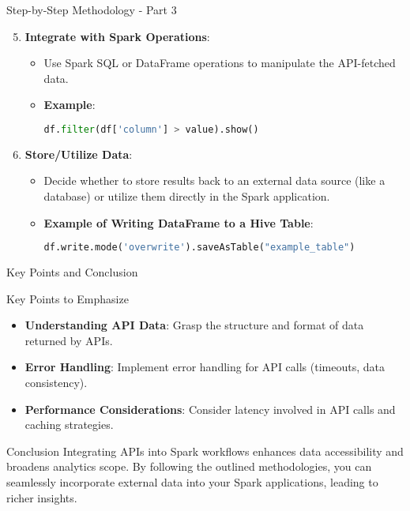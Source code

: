 \documentclass[aspectratio=169]{beamer}
\begin{document}
\begin{frame}{Step-by-Step Methodology - Part 3}
    \begin{enumerate}
        \setcounter{enumi}{4}
        \item \textbf{Integrate with Spark Operations}:
        \begin{itemize}
            \item Use Spark SQL or DataFrame operations to manipulate the API-fetched data.
            \item \textbf{Example}:
            \begin{lstlisting}[language=Python]
df.filter(df['column'] > value).show()
            \end{lstlisting}
        \end{itemize}

        \item \textbf{Store/Utilize Data}:
        \begin{itemize}
            \item Decide whether to store results back to an external data source (like a database) or utilize them directly in the Spark application.
            \item \textbf{Example of Writing DataFrame to a Hive Table}:
            \begin{lstlisting}[language=Python]
df.write.mode('overwrite').saveAsTable("example_table")
            \end{lstlisting}
        \end{itemize}
    \end{enumerate}
\end{frame}

\begin{frame}{Key Points and Conclusion}
    \begin{block}{Key Points to Emphasize}
        \begin{itemize}
            \item \textbf{Understanding API Data}: Grasp the structure and format of data returned by APIs.
            \item \textbf{Error Handling}: Implement error handling for API calls (timeouts, data consistency).
            \item \textbf{Performance Considerations}: Consider latency involved in API calls and caching strategies.
        \end{itemize}
    \end{block}

    \begin{block}{Conclusion}
        Integrating APIs into Spark workflows enhances data accessibility and broadens analytics scope. By following the outlined methodologies, you can seamlessly incorporate external data into your Spark applications, leading to richer insights.
    \end{block}
\end{frame}
\end{document}
